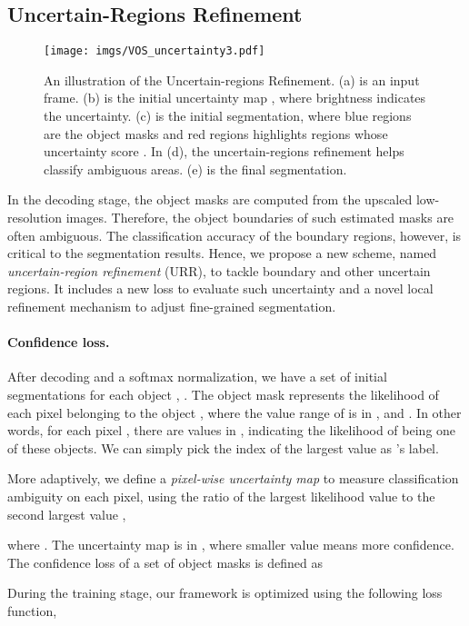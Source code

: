\documentclass{article}
\begin{document}
\subsection{Uncertain-Regions Refinement}
\label{sec:uncertainty}

\begin{figure}
    \centering
    \texttt{[image: imgs/VOS\_uncertainty3.pdf]}
    \caption{An illustration of the Uncertain-regions Refinement. (a) is an input frame. (b) is the initial uncertainty map , where brightness indicates the uncertainty. (c) is the initial segmentation, where blue regions are the object masks and red regions highlights regions whose uncertainty score . In (d), the uncertain-regions refinement helps classify ambiguous areas. (e) is the final segmentation.  }
    \label{fig:uncertainty}
\end{figure}


In the decoding stage, the object masks are computed from the upscaled low-resolution images. Therefore, the object boundaries of such estimated masks are often ambiguous. 
The classification accuracy of the boundary regions, however, is critical to the segmentation results.
Hence, we propose a new scheme, named \emph{uncertain-region refinement} (URR), to tackle boundary and other uncertain regions. 
It includes a new loss to evaluate such uncertainty and a novel local refinement mechanism to adjust fine-grained segmentation.  

\paragraph{Confidence loss.}
After decoding and a softmax normalization, we have a set of initial segmentations  for each object , .
The object mask  represents the likelihood of each pixel  belonging to the object , where the value range of  is in , and . 
In other words, for each pixel , there are  values  in , indicating the likelihood of  being one of these  objects.
We can simply pick the index  of the largest value  as 's label. 

More adaptively, we define a \emph{pixel-wise uncertainty map}  to measure classification ambiguity on each pixel, using the ratio of the largest likelihood value  to the second largest value ,

where .
The uncertainty map  is in , where smaller value means more confidence. 
The confidence loss  of a set of object masks is defined as

During the training stage, our framework is optimized using the following loss function,
\end{document}

